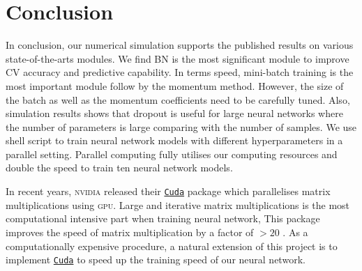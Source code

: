 \section{Conclusion}
In conclusion, our numerical simulation supports the published results on various state-of-the-arts modules. We find BN is the most significant module to improve CV accuracy and predictive capability. In terms speed, mini-batch training is the most important module follow by the momentum method. However, the size of the batch as well as the momentum coefficients need to be carefully tuned. Also, simulation results shows that dropout is useful for large neural networks where the number of parameters is large comparing with the number of samples. We use shell script to train neural network models with different hyperparameters in a parallel setting. Parallel computing fully utilises our computing resources and double the speed to train ten neural network models.

In recent years, \textsc{nvidia} released their \href{https://developer.nvidia.com/cuda-zone}{\texttt{Cuda}} package which parallelises matrix multiplications using \textsc{gpu}. Large and iterative matrix multiplications is the most computational intensive part when training neural network, This package improves the speed of matrix multiplication by a factor of $>20$ \citep{5452452}. As a computationally expensive procedure, a natural extension of this project is to implement \href{https://developer.nvidia.com/cuda-zone}{\texttt{Cuda}} to speed up the training speed of our neural network.  